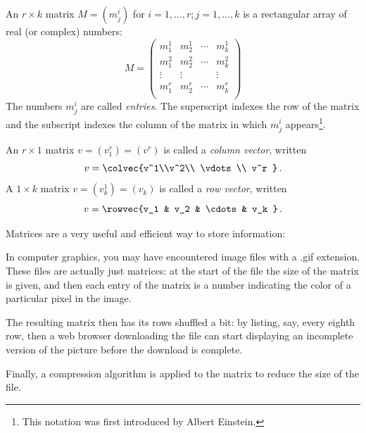 \section{\propMatricesTitle} \label{properties_matrices}


\begin{definition}
An $r\times k$ matrix $M=(m^i_j)$ for $i=1, \ldots, r; j=1, \ldots, k$ is a rectangular array of real (or complex) numbers:
\label{matrixnotation}
\[M = 
\begin{pmatrix}
m_1^1 & m_2^1 & \cdots & m_k^1 \\
m_1^2 & m_2^2 & \cdots & m_k^2 \\
\vdots & \vdots &   & \vdots \\
m_1^r & m_2^r & \cdots & m_k^r \\
\end{pmatrix}
\]
The numbers $m^i_j$ are called \emph{entries}.  The superscript indexes the row of the matrix and the subscript indexes the column of the matrix in which $m_j^i$ appears\footnote{This notation was first introduced by Albert Einstein.}.
\end{definition}


An $r\times 1$ matrix $v = (v^r_1) = (v^r)$ is called a \emph{column vector}, written \[v = \colvec{v^1\\v^2\\ \vdots \\ v^r }\, .\]  A $1\times k$ matrix $v = (v^1_k) = (v_k)$ is called a \emph{row vector}, written \[v = \rowvec{v_1 & v_2 & \cdots & v_k }\, .\]  


Matrices are a very useful and efficient way to store information:

\begin{example}
In computer graphics, you may have encountered image files with a .gif extension.  These files are actually just matrices: at the start of the file the size of the matrix is given, and then each entry of the matrix is a number indicating the color of a particular pixel in the image.

The resulting matrix  then has its rows shuffled a bit: by listing, say, every eighth row, then a web browser downloading the file can start displaying an incomplete version of the picture before the download is complete.

Finally, a compression algorithm is applied to the matrix to reduce the size of the file.
\end{example}

